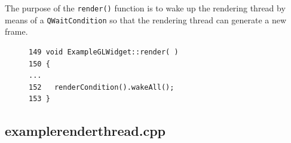 \documentclass[jou,noapacite]{apa}
\begin{document}
%
The purpose of the \lstinline|render()| function is to wake up the rendering
thread by means of a \lstinline|QWaitCondition| so that the rendering thread can
generate a new frame.
%
\begin{figure}[h]
\begin{lstlisting}[basicstyle=\scriptsize]
149 void ExampleGLWidget::render( )
150 {
...
152   renderCondition().wakeAll();
153 }
\end{lstlisting}
\end{figure}

\subsection{examplerenderthread.cpp}
\end{document}
